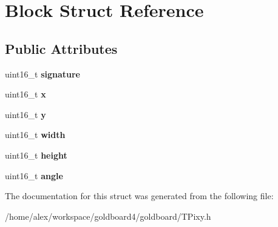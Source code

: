 \hypertarget{struct_block}{}\section{Block Struct Reference}
\label{struct_block}
\subsection*{Public Attributes}
\begin{DoxyCompactItemize}
\item 
uint16\+\_\+t {\bfseries signature}\hypertarget{struct_block_a4b09deb0955346ab3ee5f9d28d3dd24c}{}\label{struct_block_a4b09deb0955346ab3ee5f9d28d3dd24c}

\item 
uint16\+\_\+t {\bfseries x}\hypertarget{struct_block_af05be11b22efaf44b3b0712420838cbb}{}\label{struct_block_af05be11b22efaf44b3b0712420838cbb}

\item 
uint16\+\_\+t {\bfseries y}\hypertarget{struct_block_a86d0e413b7dd0346c3d0771f8dddba1c}{}\label{struct_block_a86d0e413b7dd0346c3d0771f8dddba1c}

\item 
uint16\+\_\+t {\bfseries width}\hypertarget{struct_block_a393b5c60f6a9ffbadc9645f882f71009}{}\label{struct_block_a393b5c60f6a9ffbadc9645f882f71009}

\item 
uint16\+\_\+t {\bfseries height}\hypertarget{struct_block_af83cd7a2f0b1bb7b8d0d04783028551d}{}\label{struct_block_af83cd7a2f0b1bb7b8d0d04783028551d}

\item 
uint16\+\_\+t {\bfseries angle}\hypertarget{struct_block_abfcbef5f0ab852d55f375ae4c3011555}{}\label{struct_block_abfcbef5f0ab852d55f375ae4c3011555}

\end{DoxyCompactItemize}


The documentation for this struct was generated from the following file\+:\begin{DoxyCompactItemize}
\item 
/home/alex/workspace/goldboard4/goldboard/T\+Pixy.\+h\end{DoxyCompactItemize}

